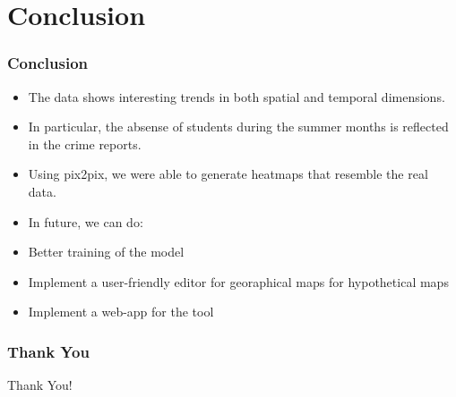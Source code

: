 \documentclass{beamer}
\begin{document}
\section{Conclusion}
\begin{frame}
    \frametitle{Conclusion}
    \begin{itemize}
        \item The data shows interesting trends in both spatial and temporal dimensions.
        \item In particular, the absense of students during the summer months is reflected in the crime reports.
        \item Using pix2pix, we were able to generate heatmaps that resemble the real data.
        \item In future, we can do:
        \item \quad Better training of the model
        \item \quad Implement a user-friendly editor for georaphical maps for hypothetical maps
        \item \quad Implement a web-app for the tool
    \end{itemize}
\end{frame}

\begin{frame}
    \frametitle{Thank You}
    \centering
    \Huge Thank You!
\end{frame}
\end{document}
